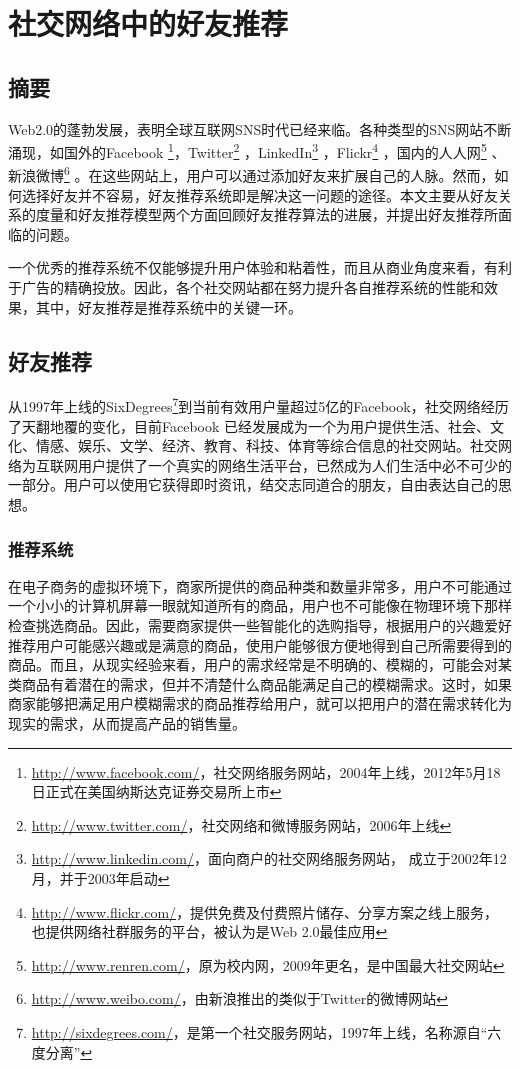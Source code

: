 \chapter{社交网络中的好友推荐}
\date{2012-06-19}
\section{摘要}
Web2.0的蓬勃发展，表明全球互联网SNS时代已经来临。各种类型的SNS网站不断涌现，如国外的Facebook \footnote{\url{http://www.facebook.com/}，社交网络服务网站，2004年上线，2012年5月18日正式在美国纳斯达克证券交易所上市}，Twitter\footnote{\url{http://www.twitter.com/}，社交网络和微博服务网站，2006年上线} ，LinkedIn\footnote{\url{http://www.linkedin.com/}，面向商户的社交网络服务网站， 成立于2002年12月，并于2003年启动} ，Flickr\footnote{\url{http://www.flickr.com/}，提供免费及付费照片储存、分享方案之线上服务，也提供网络社群服务的平台，被认为是Web 2.0最佳应用} ，国内的人人网\footnote{\url{http://www.renren.com/}，原为校内网，2009年更名，是中国最大社交网站} 、 新浪微博\footnote{\url{http://www.weibo.com/}，由新浪推出的类似于Twitter的微博网站} 。在这些网站上，用户可以通过添加好友来扩展自己的人脉。然而，如何选择好友并不容易，好友推荐系统即是解决这一问题的途径。本文主要从好友关系的度量和好友推荐模型两个方面回顾好友推荐算法的进展，并提出好友推荐所面临的问题。

一个优秀的推荐系统不仅能够提升用户体验和粘着性，而且从商业角度来看，有利于广告的精确投放。因此，各个社交网站都在努力提升各自推荐系统的性能和效果，其中，好友推荐是推荐系统中的关键一环。

\section{好友推荐}
从1997年上线的SixDegrees\footnote{\url{http://sixdegrees.com/}，是第一个社交服务网站，1997年上线，名称源自“六度分离”}到当前有效用户量超过5亿的Facebook，社交网络经历了天翻地覆的变化，目前Facebook 已经发展成为一个为用户提供生活、社会、文化、情感、娱乐、文学、经济、教育、科技、体育等综合信息的社交网站。社交网络为互联网用户提供了一个真实的网络生活平台，已然成为人们生活中必不可少的一部分。用户可以使用它获得即时资讯，结交志同道合的朋友，自由表达自己的思想。

\subsection{推荐系统}
在电子商务的虚拟环境下，商家所提供的商品种类和数量非常多，用户不可能通过一个小小的计算机屏幕一眼就知道所有的商品，用户也不可能像在物理环境下那样检查挑选商品。因此，需要商家提供一些智能化的选购指导，根据用户的兴趣爱好推荐用户可能感兴趣或是满意的商品，使用户能够很方便地得到自己所需要得到的商品。而且，从现实经验来看，用户的需求经常是不明确的、模糊的，可能会对某类商品有着潜在的需求，但并不清楚什么商品能满足自己的模糊需求。这时，如果商家能够把满足用户模糊需求的商品推荐给用户，就可以把用户的潜在需求转化为现实的需求，从而提高产品的销售量。

